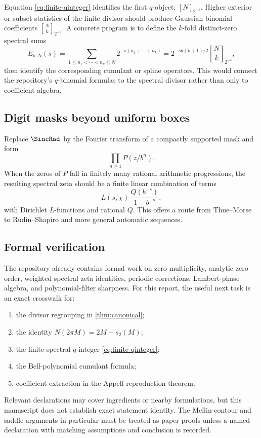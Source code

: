 \documentclass[11pt,oneside]{article}
\theoremstyle{definition}
\theoremstyle{remark}
\begin{document}
Equation \eqref{eq:finite-qinteger} identifies the first \(q\)-object:
\([N]_{2^{-s}}\).  Higher exterior or subset statistics of the finite divisor
should produce Gaussian binomial coefficients
\(\genfrac{[}{]}{0pt}{}{N}{k}_{2^{-s}}\).  A concrete program is to define
the \(k\)-fold distinct-zero spectral sums
\[
 E_{k,N}(s)
 =\sum_{1\leq n_1<\cdots<n_k\leq N}
 2^{-s(n_1+\cdots+n_k)}
 =2^{-sk(k+1)/2}
  \genfrac{[}{]}{0pt}{}{N}{k}_{2^{-s}},
\]
then identify the corresponding cumulant or spline operators.  This would
connect the repository's \(q\)-binomial formulas to the spectral divisor
rather than only to coefficient algebra.

\subsection{Digit masks beyond uniform boxes}

Replace \(\SincRad\) by the Fourier transform of a compactly supported mask and
form
\[
 \prod_{n\geq1}P(z/b^n).
\]
When the zeros of \(P\) fall in finitely many rational arithmetic
progressions, the resulting spectral zeta should be a finite linear
combination of terms
\[
 L(s,\chi)\,\frac{Q(b^{-s})}{1-b^{-s}},
\]
with Dirichlet \(L\)-functions and rational \(Q\).  This offers a route from
Thue--Morse to Rudin--Shapiro and more general automatic sequences.

\subsection{Formal verification}

The repository already contains formal work on zero multiplicity, analytic
zero order, weighted spectral zeta identities, periodic corrections,
Lambert-phase algebra, and polynomial-filter sharpness.  For this report, the
useful next task is an exact crosswalk for:
\begin{enumerate}[label=(\roman*),leftmargin=2.5em]
\item the divisor regrouping in \cref{thm:canonical};
\item the identity \(N(2\pi M)=2M-s_2(M)\);
\item the finite spectral \(q\)-integer \eqref{eq:finite-qinteger};
\item the Bell-polynomial cumulant formula;
\item coefficient extraction in the Appell reproduction theorem.
\end{enumerate}
Relevant declarations may cover ingredients or nearby formulations, but this
manuscript does not establish exact statement identity.  The Mellin-contour
and saddle arguments in particular must be treated as paper proofs unless a
named declaration with matching assumptions and conclusion is recorded.
\end{document}
